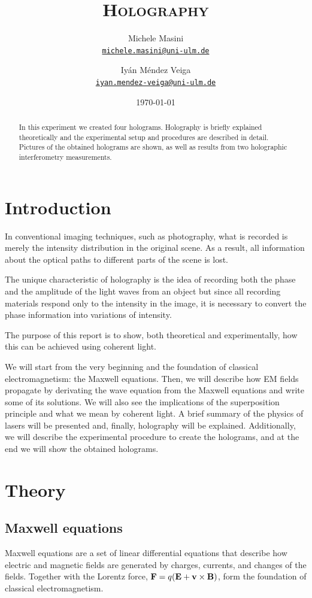 \documentclass[11pt,a4paper]{article}
\title{\bfseries\textsc{Holography}}
\author{
Michele Masini\\ \small\texttt{\href{mailto:michele.masini@uni-ulm.de}{michele.masini@uni-ulm.de}}\and
Iyán Méndez Veiga\\ \small\texttt{\href{mailto:iyan.mendez-veiga@uni-ulm.de}{iyan.mendez-veiga@uni-ulm.de}}
}
\date{\today}
\begin{document}
\maketitle

\begin{abstract}
In this experiment we created four holograms. Holography is briefly explained theoretically and the experimental setup and procedures are described in detail. Pictures of the obtained holograms are shown, as well as results from two holographic interferometry measurements.
\end{abstract}

\vspace{1.5cm}

\section{Introduction}
In conventional imaging techniques, such as photography, what is recorded is merely the intensity distribution in the original scene. As a result, all information about the optical paths to different parts of the scene is lost.

The unique characteristic of holography is the idea of recording both the phase and the amplitude of the light waves from an object but since all recording materials respond only to the intensity in the image, it is necessary to convert
the phase information into variations of intensity.

The purpose of this report is to show, both theoretical and experimentally, how this can be achieved using coherent light.

We will start from the very beginning and the foundation of classical electromagnetism: the Maxwell equations. Then, we will describe how EM fields propagate by derivating the wave equation from the Maxwell equations and write some of its solutions. We will also see the implications of the superposition principle and what we mean by coherent light. A brief summary of the physics of lasers will be presented and, finally, holography will be explained. Additionally, we will describe the experimental procedure to create the holograms, and at the end we will show the obtained holograms.


\section{Theory}

\subsection{Maxwell equations}
Maxwell equations \cite{feynman} are a set of linear differential equations that describe how electric and magnetic fields are generated by charges, currents, and changes of the fields. Together with the Lorentz force, $\vb{F}=q(\vb{E}+\vb{v}\times\vb{B})$, form the foundation of classical electromagnetism.
\end{document}
